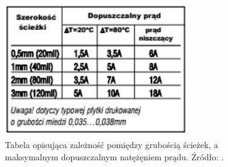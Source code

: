 \begin{figure}[H]
	\centering
	\includegraphics[width=8cm]{img/board_layouts/pcb_wire_thickness.png}
	\caption{Tabela opisująca zależność pomiędzy grubością ścieżek, a maksymalnym dopuszczalnym natężęniem prądu. Źródło: \cite{pcb_wire_thickness}.}
	\label{fig:image_pcb_wire_thickness}
\end{figure}
 

